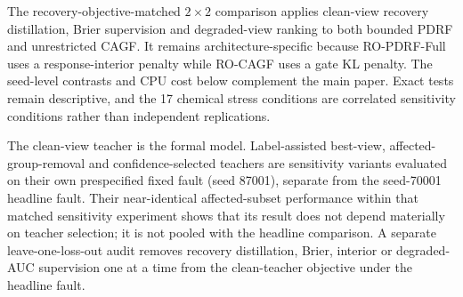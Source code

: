 \documentclass[10pt]{article}
\begin{document}
The recovery-objective-matched $2\times2$ comparison applies clean-view recovery distillation, Brier supervision and degraded-view ranking to both bounded PDRF and unrestricted CAGF. It remains architecture-specific because RO-PDRF-Full uses a response-interior penalty while RO-CAGF uses a gate KL penalty. The seed-level contrasts and CPU cost below complement the main paper. Exact tests remain descriptive, and the 17 chemical stress conditions are correlated sensitivity conditions rather than independent replications.

\begin{table}[ht]
\centering
\caption{Recovery-objective-matched chemical and hydraulic contrasts. Positive values favour the first named method.}
\resizebox{\textwidth}{!}{}
\end{table}

\begin{table}[ht]
\centering
\caption{Recovery-objective-matched parameter counts and measured CPU costs. All four methods use three forward paths during training and one during inference.}
\resizebox{0.90\textwidth}{!}{}
\end{table}

The clean-view teacher is the formal model. Label-assisted best-view, affected-group-removal and confidence-selected teachers are sensitivity variants evaluated on their own prespecified fixed fault (seed 87001), separate from the seed-70001 headline fault. Their near-identical affected-subset performance within that matched sensitivity experiment shows that its result does not depend materially on teacher selection; it is not pooled with the headline comparison. A separate leave-one-loss-out audit removes recovery distillation, Brier, interior or degraded-AUC supervision one at a time from the clean-teacher objective under the headline fault.

\begin{table}[ht]
\centering
\caption{Recovery-teacher audit across 10 matched chemical-array seeds. Clean-only is the formal teacher; best-CE uses training labels and is retained only as sensitivity.}
\resizebox{0.84\textwidth}{!}{}
\end{table}

\begin{table}[ht]
\centering
\caption{Leave-one-loss-out affected-AUROC contrasts. Positive full-minus-ablated differences favour the complete recovery objective.}
\resizebox{0.82\textwidth}{!}{}
\end{table}
\end{document}
